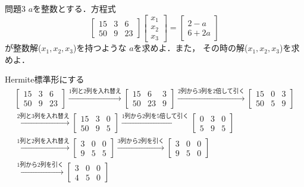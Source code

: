 \begin{itembox}[l]{問題3}
$a$を整数とする．方程式
\begin{equation}
    \begin{bmatrix}
    15 & 3 & 6\\
    50 & 9 & 23
    \end{bmatrix}
    \begin{bmatrix}
    x_1\\
    x_2\\
    x_3
    \end{bmatrix}
    = 
    \begin{bmatrix}
    2 - a\\
    6 + 2a
    \end{bmatrix}
\end{equation}
が整数解($x_1,x_2,x_3$)を持つような
$a$を求めよ．また，
その時の解($x_1,x_2,x_3$)を求めよ．
\end{itembox}
Hermite標準形にする
\begin{align}
\begin{bmatrix}
15 & 3 & 6\\
50 & 9 & 23
\end{bmatrix}
\xrightarrow[]{\text{1列と2列を入れ替え}}
\begin{bmatrix}
15 & 6 & 3\\
50 & 23 & 9 
\end{bmatrix}
\xrightarrow[]{\text{2列から3列を2倍して引く}}
\begin{bmatrix}
15 & 0 & 3\\
50 & 5 & 9 
\end{bmatrix}\\
\xrightarrow[]{\text{2列と3列を入れ替え}}
\begin{bmatrix}
15 & 3 & 0\\
50 & 9 & 5 
\end{bmatrix}
\xrightarrow[]{\text{1列から2列を5倍して引く}}
\begin{bmatrix}
0 & 3 & 0\\
5 & 9 & 5 
\end{bmatrix}\\
\xrightarrow[]{\text{1列と2列を入れ替え}}
\begin{bmatrix}
 3 & 0 & 0\\
 9 & 5  & 5
\end{bmatrix}
\xrightarrow[]{\text{3列から2列を引く}}
\begin{bmatrix}
 3 & 0 & 0\\
 9 & 5  & 0
\end{bmatrix}\\
\xrightarrow[]{\text{1列から2列を引く}}
\begin{bmatrix}
 3 & 0 & 0\\
 4 & 5  & 0
\end{bmatrix}
\end{align}
